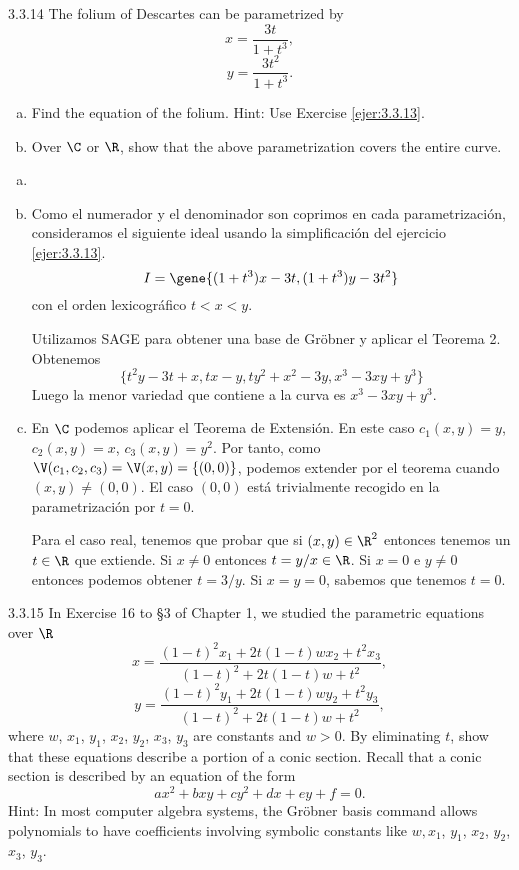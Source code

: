 \documentclass[twoside]{article}
\begin{document}
\begin{ejercicio}{3.3.14}
The folium of Descartes can be parametrized by
\[x =
\frac{3t}{1 + t^3} ,\]
\[y =
\frac{3t^2}{1 + t^3} .\]
\begin{enumerate}[a.]
\item Find the equation of the folium. Hint: Use Exercise \ref{ejer:3.3.13}.
\item Over $\C$ or $\R$, show that the above parametrization covers the entire curve.
\end{enumerate}
\end{ejercicio}
\begin{solucion}
\begin{enumerate}[a.]
\item[]
\item Como el numerador y el denominador son coprimos en cada parametrización, consideramos el siguiente ideal usando la simplificación del ejercicio \ref{ejer:3.3.13}.
\[ I = \gene{(1+t^3)x-3t, (1+t^3)y-3t^2}\]
con el orden lexicográfico $t < x < y$.

Utilizamos SAGE para obtener una base de Gröbner y aplicar el Teorema 2. Obtenemos
$$
\{t^2y - 3t + x, tx - y, ty^2 + x^2 - 3y, x^3 - 3xy + y^3 \}
$$
Luego la menor variedad que contiene a la curva es $x^3-3xy+y^3$. 
\item En $\C$ podemos aplicar el Teorema de Extensión. En este caso $c_1(x,y)=y$, $c_2(x,y)=x$, $c_3(x,y)=y^2$.
Por tanto, como $\V(c_1,c_2,c_3) = \V(x,y) = \{(0,0)\}$, podemos extender por el teorema cuando $(x,y)\neq (0,0)$.
El caso $(0,0)$ está trivialmente recogido en la parametrización por $t=0$.

Para el caso real, tenemos que probar que si $(x,y)\in \R^2$ entonces tenemos un $t\in \R$ que extiende. Si $x\neq 0$ entonces $t=y/x \in \R$. Si $x=0$ e $y\neq 0$ entonces podemos obtener $t=3/y$. Si $x=y=0$, sabemos que tenemos $t=0$.
\end{enumerate}
\end{solucion}


\newpage

\begin{ejercicio}{3.3.15}
In Exercise 16 to §3 of Chapter 1, we studied the parametric equations over $\R$
\[x =
\frac{(1 − t)^2x_1 + 2t(1 − t)wx_2 + t^2x_3}{
(1 − t)^2 + 2t(1 − t)w + t^2 } ,\]
\[y =
\frac{(1 − t)^2y_1 + 2t(1 − t)wy_2 + t^2y_3}{
(1 − t)^2 + 2t(1 − t)w + t^2} ,\]
where $w$, $x_1$, $y_1$, $x_2$, $y_2$, $x_3$, $y_3$ are constants and $w > 0$. By eliminating $t$, show that these
equations describe a portion of a conic section. Recall that a conic section is described
by an equation of the form
\[ax^2 + bxy + cy^2 + dx + ey + f = 0.\]
Hint: In most computer algebra systems, the Gröbner basis command allows polynomials
to have coefficients involving symbolic constants like $w, x_1$, $y_1$, $x_2$, $y_2$, $x_3$, $y_3$.
\end{ejercicio}
\begin{solucion}
\end{solucion}
\end{document}
